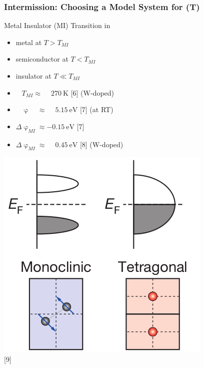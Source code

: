 \documentclass{beamer}
\begin{document}
\begin{frame}
\frametitle{Intermission: Choosing a Model System for \spv{}(T)}
\begin{block}{Metal Insulator (MI) Transition in \vadiox{}}
\begin{minipage}{0.6\linewidth}
	\begin{itemize}
		\item metal at $T>T_{MI}$
		\item semiconductor at $T<T_{MI}$
		\item insulator at $T \ll T_{MI}$
		\item $\phantom{\Delta}T_{MI}\approx \phantom{-}\SI{270}{\kelvin}$ \hspace{0.15cm} \textcolor{RUred}{[6]} (W-doped)
		\item $\phantom{\Delta}\upvarphi\phantom{_{MI}} \approx  \phantom{-}\SI{5.15}{\electronvolt}$ \textcolor{RUred}{[7]} (at RT)
		\item $\Delta\upvarphi_{MI} \approx  -\SI{0.15}{\electronvolt}$ \textcolor{RUred}{[7]}
		\item $\Delta\upvarphi_{MI} \approx  \phantom{-}\SI{0.45}{\electronvolt}$ \textcolor{RUred}{[8]} (W-doped)
	\end{itemize}
\end{minipage}
\hfill
\begin{minipage}{0.35\linewidth}
\centering
	\includegraphics[width=1\linewidth]{./figs/pres/vo2gapopening}\\
	\textcolor{RUred}{[9]}
\end{minipage}
\end{block}\end{frame}
\end{document}
